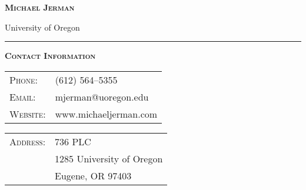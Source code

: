 \documentclass[12pt]{article}
\begin{document}
\hspace*{\fill} \textbf{\textsc{\Large Michael Jerman}} \hspace*{\fill}

\hspace*{\fill} University of Oregon \hspace*{\fill}  


\bigskip

\hrule

\bigskip

\noindent \textsc{\large \textbf{Contact Information}}

\bigskip

\noindent\begin{minipage}[t]{.49\textwidth}
\begin{tabular}{ll}
    \textsc{Phone:} & (612) 564--5355 \\
    \textsc{Email:} & mjerman@uoregon.edu \\
    \textsc{Website:} & www.michaeljerman.com 
\end{tabular}
\end{minipage}
\hspace*{\fill}
\begin{minipage}[t]{.49\textwidth}
\hspace*{\fill}
\begin{tabular}{ll}
    \textsc{Address:} & 736 PLC \\
    & 1285 University of Oregon \\
    & Eugene, OR 97403
\end{tabular}
\end{minipage}





\end{document}
